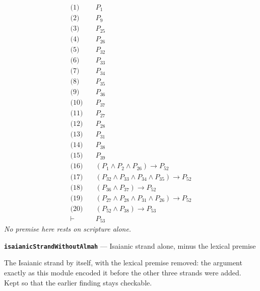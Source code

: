 \documentclass[11pt]{article}
\begin{document}
\begin{align*}
  \text{(1)} \quad & P_{1} \\
  \text{(2)} \quad & P_{9} \\
  \text{(3)} \quad & P_{25} \\
  \text{(4)} \quad & P_{26} \\
  \text{(5)} \quad & P_{32} \\
  \text{(6)} \quad & P_{33} \\
  \text{(7)} \quad & P_{34} \\
  \text{(8)} \quad & P_{35} \\
  \text{(9)} \quad & P_{36} \\
  \text{(10)} \quad & P_{37} \\
  \text{(11)} \quad & P_{27} \\
  \text{(12)} \quad & P_{28} \\
  \text{(13)} \quad & P_{31} \\
  \text{(14)} \quad & P_{38} \\
  \text{(15)} \quad & P_{39} \\
  \text{(16)} \quad & (P_{1} \land P_{2} \land P_{26}) \rightarrow P_{52} \\
  \text{(17)} \quad & (P_{32} \land P_{33} \land P_{34} \land P_{35}) \rightarrow P_{52} \\
  \text{(18)} \quad & (P_{36} \land P_{37}) \rightarrow P_{52} \\
  \text{(19)} \quad & (P_{27} \land P_{28} \land P_{31} \land P_{26}) \rightarrow P_{52} \\
  \text{(20)} \quad & (P_{52} \land P_{38}) \rightarrow P_{53} \\
  \vdash \quad & P_{53}
\end{align*}
\emph{No premise here rests on scripture alone.}
\par\medskip\noindent\textbf{\texttt{isaianic\allowbreak{}Strand\allowbreak{}Without\allowbreak{}Almah}} --- Isaianic strand alone, minus the lexical premise\par\nobreak\noindent
The Isaianic strand by itself, with the lexical premise removed: the argument exactly as this module encoded it before the other three strands were added. Kept so that the earlier finding stays checkable.
\end{document}
